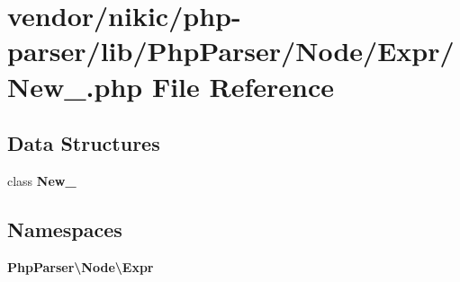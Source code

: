 \section{vendor/nikic/php-\/parser/lib/\+Php\+Parser/\+Node/\+Expr/\+New\+\_\+.php File Reference}
\label{_new___8php}
\subsection*{Data Structures}
\begin{DoxyCompactItemize}
\item 
class {\bf New\+\_\+}
\end{DoxyCompactItemize}
\subsection*{Namespaces}
\begin{DoxyCompactItemize}
\item 
 {\bf Php\+Parser\textbackslash{}\+Node\textbackslash{}\+Expr}
\end{DoxyCompactItemize}
